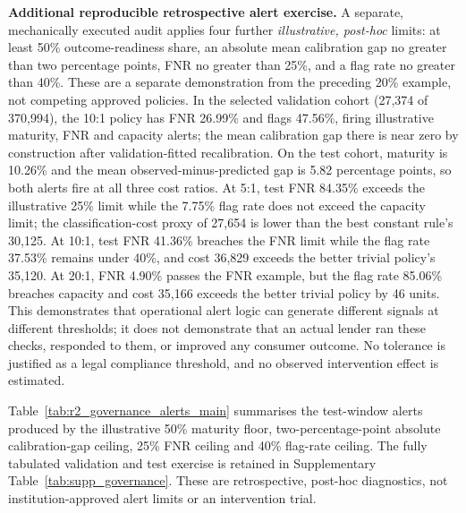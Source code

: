 \documentclass[10pt]{article}
\begin{document}
\noindent\textbf{Additional reproducible retrospective alert exercise.} A separate, mechanically executed audit applies four further \emph{illustrative, post-hoc} limits: at least 50\% outcome-readiness share, an absolute mean calibration gap no greater than two percentage points, FNR no greater than 25\%, and a flag rate no greater than 40\%. These are a separate demonstration from the preceding 20\% example, not competing approved policies. In the selected validation cohort (27,374 of 370,994), the 10:1 policy has FNR 26.99\% and flags 47.56\%, firing illustrative maturity, FNR and capacity alerts; the mean calibration gap there is near zero by construction after validation-fitted recalibration. On the test cohort, maturity is 10.26\% and the mean observed-minus-predicted gap is 5.82 percentage points, so both alerts fire at all three cost ratios. At 5:1, test FNR 84.35\% exceeds the illustrative 25\% limit while the 7.75\% flag rate does not exceed the capacity limit; the classification-cost proxy of 27,654 is lower than the best constant rule's 30,125. At 10:1, test FNR 41.36\% breaches the FNR limit while the flag rate 37.53\% remains under 40\%, and cost 36,829 exceeds the better trivial policy's 35,120. At 20:1, FNR 4.90\% passes the FNR example, but the flag rate 85.06\% breaches capacity and cost 35,166 exceeds the better trivial policy by 46 units. This demonstrates that operational alert logic can generate different signals at different thresholds; it does not demonstrate that an actual lender ran these checks, responded to them, or improved any consumer outcome. No tolerance is justified as a legal compliance threshold, and no observed intervention effect is estimated.



Table~\ref{tab:r2_governance_alerts_main} summarises the test-window alerts produced by the illustrative 50\% maturity floor, two-percentage-point absolute calibration-gap ceiling, 25\% FNR ceiling and 40\% flag-rate ceiling. The fully tabulated validation and test exercise is retained in Supplementary Table~\ref{tab:supp_governance}. These are retrospective, post-hoc diagnostics, not institution-approved alert limits or an intervention trial.
\end{document}
